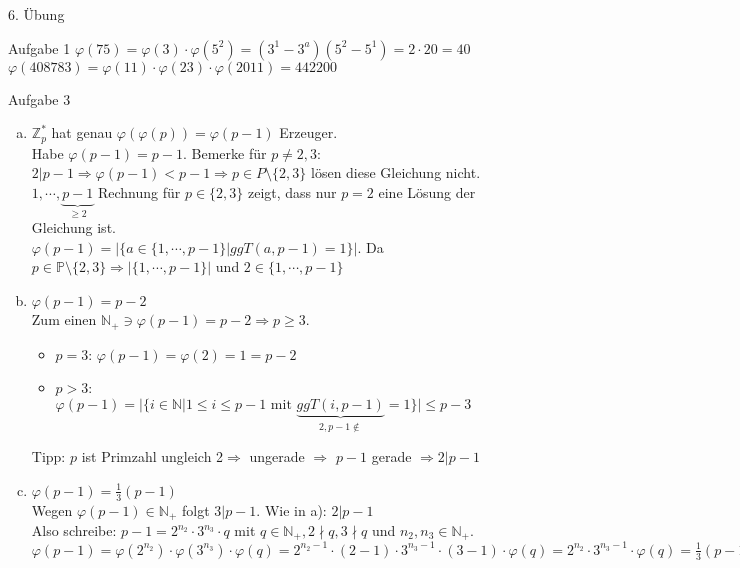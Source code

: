 \begin{section}{6. Übung}
 \begin{subsection}{Aufgabe 1}
  $\varphi(75) = \varphi(3) \cdot \varphi(5^2) = (3^1 -3^a)(5^2 - 5^1) = 2 \cdot 20 = 40$\\
  $\varphi(408783) = \varphi(11)\cdot \varphi(23)\cdot\varphi(2011) = 442200$
 \end{subsection}
 \begin{subsection}{Aufgabe 3}
 \begin{enumerate}[a)]
  \item $\mathbb{Z}_p^*$ hat genau $\varphi(\varphi(p)) = \varphi(p-1)$ Erzeuger.\\
  Habe $\varphi(p-1) = p-1$. Bemerke für $p \neq 2,3$: $2|p-1 \Rightarrow \varphi(p-1) < p-1 \Rightarrow p \in P\setminus \{2,3\}$ lösen diese Gleichung nicht.\\
  $1, \cdots, \underbrace{p-1}_{\geq 2}$ Rechnung für $p \in \{2,3\}$ zeigt, dass nur $p=2$ eine Lösung der Gleichung ist.\\
  $\varphi(p-1) = |\{a \in \{1,\cdots, p-1\}|ggT(a,p-1)=1\}|$. Da $p \in \mathbb{P}\setminus \{2,3\} \Rightarrow |\{1,\cdots,p-1\}|$ und $2\in \{1,\cdots,p-1\}$
  \item $\varphi(p-1)=p-2$ \\
  Zum einen $\mathbb{N}_+ \ni \varphi(p-1)= p-2 \Rightarrow p \geq 3$.\\
  \begin{itemize}
   \item $p = 3$: $\varphi(p-1)=\varphi(2)=1 = p-2$ \checkmark
   \item $p>3$: $\varphi(p-1) = |\{i \in \mathbb{N}|1 \leq i \leq p-1 \text{ mit } \underbrace{ggT(i,p-1)}_{2,p-1 \not\in} = 1\}| \leq p-3$\\
  \end{itemize}
   Tipp: $p$ ist Primzahl ungleich 2$\Rightarrow$ ungerade $\Rightarrow$ $p-1$ gerade $\Rightarrow 2|p-1$
  \item $\varphi(p-1) = \frac{1}{3}(p-1)$\\
  Wegen $\varphi(p-1) \in \mathbb{N}_+$ folgt $3|p-1$. Wie in a): $2|p-1$\\
  Also schreibe: $p-1 = 2^{n_2}\cdot 3^{n_3} \cdot q$ mit $q \in \mathbb{N}_+, 2 \nmid q, 3\nmid q$ und $n_2, n_3 \in \mathbb{N}_+$.\\
  $\varphi(p-1) = \varphi(2^{n_2}) \cdot \varphi(3^{n_3}) \cdot \varphi(q) = 2^{n_2-1}\cdot (2-1)\cdot 3^{n_3-1}\cdot (3-1) \cdot \varphi(q) = 2^{n_2} \cdot 3^{n_3-1} \cdot \varphi(q) = \frac{1}{3}(p-1) = 2^{n_2} \cdot 3^{n_3-1} \cdot q \Rightarrow \varphi(q) = q \Rightarrow q = 1$ \\

\end{enumerate}
\end{subsection}
\end{section}
